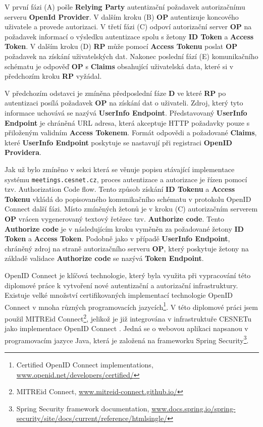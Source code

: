 \documentclass[
  printed, %
  twoside, %
  table,   %
  nolof,     %
  nolot,     %
]{fithesis3}
\begin{document}
V první fázi (A) pošle \textbf{Relying Party} autentizační požadavek autorizačnímu serveru \textbf{OpenId Provider}. V dalším kroku (B) \textbf{OP} autentizuje koncového uživatele a provede autorizaci. V třetí fázi (C) odpoví autorizační server \textbf{OP} na požadavek informací o výsledku autentizace spolu s žetony \textbf{ID Token} a \textbf{Access Token}. V dalším kroku (D) \textbf{RP} může pomocí \textbf{Access Tokenu} poslat \textbf{OP} požadavek na získání uživatelských dat. Nakonec poslední fází (E) komunikačního schématu je odpověď \textbf{OP} s \textbf{Claims} obsahující uživatelská data, které si v předchozím kroku \textbf{RP} vyžádal. 
\par

V předchozím odstavci je zmíněna předposlední fáze \textbf{D} ve které \textbf{RP} po autentizaci posílá požadavek \textbf{OP} na získání dat o uživateli. Zdroj, který tyto informace uchovává se nazývá \textbf{UserInfo Endpoint}. Představovaný \textbf{UserInfo Endpoint} je chráněná URL adresa, která akceptuje HTTP požadavky pouze s přiloženým validním \textbf{Access Tokenem}. Formát odpovědi a požadované \textbf{Claims}, které \textbf{UserInfo Endpoint} poskytuje se nastavují při registraci \textbf{OpenID Providera}. 
\par

Jak už bylo zmíněno v sekci která se věnuje popisu stávající implementace systému \texttt{meetings.cesnet.cz}, proces autentizace a autorizace je řízen pomocí tzv. Authorization Code flow. Tento způsob získání \textbf{ID Tokenu} a \textbf{Access Tokenu} vkládá do popisovaného komunikačního schématu v protokolu OpenID Connect další fázi. Místo zmíněných žetonů je v kroku (C) autorizačním serverem \textbf{OP} vrácen vygenerovaný textový řetězec tzv. \textbf{Authorize code}. Tento \textbf{Authorize code} je v následujícím kroku vyměněn za požadované žetony \textbf{ID Token} a \textbf{Access Token}. Podobně jako v případě \textbf{UserInfo Endpoint}, chráněný zdroj na straně autorizačního serveru \textbf{OP}, který poskytuje žetony na základě validace \textbf{Authorize code} se nazývá \textbf{Token Endpoint}.

\par
OpenID Connect je klíčová technologie, který byla využita při vypracování této diplomové práce k vytvoření nové autentizační a autorizační infrastruktury. Existuje velké množství certifikovaných implementací technologie OpenID Connect v mnoha různých programovacích jazycích\footnote{Certified OpenID Connect implementations, \url{www.openid.net/developers/certified/}}. V této diplomové práci jsem použil MITREid Connect\footnote{MITREid Connect, \url{www.mitreid-connect.github.io/}}, jelikož je již integrována v infrastruktuře CESNETu jako implementace OpenID Connect \cite{oidcPresentation}. Jedná se o webovou aplikaci napsanou v programovacím jazyce Java, která je založená na frameworku Spring Security\footnote{Spring Security framework documentation, \url{www.docs.spring.io/spring-security/site/docs/current/reference/htmlsingle/}}. 
\end{document}
